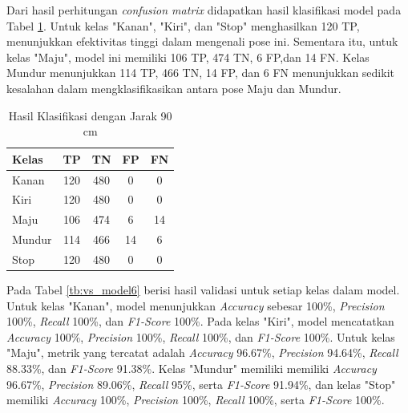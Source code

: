 Dari hasil perhitungan \emph{confusion matrix} didapatkan hasil klasifikasi model pada Tabel \ref{tb:cm_model6}. Untuk kelas "Kanan", "Kiri", dan "Stop" menghasilkan 120 TP, menunjukkan efektivitas tinggi dalam mengenali pose ini. Sementara itu, untuk kelas "Maju", model ini memiliki 106 TP, 474 TN, 6 FP,dan 14 FN. Kelas Mundur menunjukkan 114 TP, 466 TN, 14 FP, dan 6 FN menunjukkan sedikit kesalahan dalam mengklasifikasikan antara pose Maju dan Mundur.  

\begin{longtable}{|l|c|c|c|c|}
  \caption{Hasil Klasifikasi dengan Jarak 90 cm}
  \label{tb:cm_model6} \\
  \hline
  \rowcolor[HTML]{C0C0C0} 
  \textbf{Kelas} & \textbf{TP} & \textbf{TN} & \textbf{FP} & \textbf{FN} \\ \hline
  Kanan    & 120          & 480         & 0           & 0           \\ \hline
  Kiri      & 120          & 480         & 0           & 0           \\ \hline
  Maju      & 106          & 474         & 6           & 14           \\ \hline
  Mundur     & 114          & 466         & 14           & 6           \\ \hline
  Stop  & 120          & 480         & 0           & 0           \\ \hline
\end{longtable}

Pada Tabel \ref{tb:vs_model6} berisi hasil validasi untuk setiap kelas dalam model. Untuk kelas "Kanan", model menunjukkan \textit{Accuracy} sebesar 100\%, \textit{Precision} 100\%, \textit{Recall} 100\%, dan \textit{F1-Score} 100\%. Pada kelas "Kiri", model mencatatkan \textit{Accuracy} 100\%, \textit{Precision} 100\%, \textit{Recall} 100\%, dan \textit{F1-Score} 100\%. Untuk kelas "Maju", metrik yang tercatat adalah \textit{Accuracy} 96.67\%, \textit{Precision} 94.64\%, \textit{Recall} 88.33\%, dan \textit{F1-Score} 91.38\%. Kelas "Mundur" memiliki memiliki \textit{Accuracy} 96.67\%, \textit{Precision} 89.06\%, \textit{Recall} 95\%, serta \textit{F1-Score} 91.94\%, dan kelas "Stop" memiliki \textit{Accuracy} 100\%, \textit{Precision} 100\%, \textit{Recall} 100\%, serta \textit{F1-Score} 100\%.

